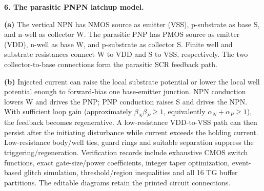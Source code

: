 \documentclass[10pt]{article}
\newcommand{\ground}[2]{\draw (#1,#2)--(#1,{#2-.12});\draw ({#1-.17},{#2-.12})--({#1+.17},{#2-.12});\draw ({#1-.11},{#2-.20})--({#1+.11},{#2-.20});}
\newcommand{\rail}[3]{\draw (#1,#2)--(#1,{#2+.14});\node[above,font=\scriptsize] at (#1,{#2+.14}) {$#3$};}
\begin{document}
\newpage\textbf{6. The parasitic PNPN latchup model.}
\begin{center}\end{center}
\textbf{(a)} The vertical NPN has NMOS source as emitter (VSS), p-substrate as base S, and n-well as collector W. The parasitic PNP has PMOS source as emitter (VDD), n-well as base W, and p-substrate as collector S. Finite well and substrate resistances connect W to VDD and S to VSS, respectively. The two collector-to-base connections form the parasitic SCR feedback path.

\textbf{(b)} Injected current can raise the local substrate potential or lower the local well potential enough to forward-bias one base-emitter junction. NPN conduction lowers W and drives the PNP; PNP conduction raises S and drives the NPN. With sufficient loop gain (approximately $\beta_N\beta_P\geq1$, equivalently $\alpha_N+\alpha_P\geq1$), the feedback becomes regenerative. A low-resistance VDD-to-VSS path can then persist after the initiating disturbance while current exceeds the holding current. Low-resistance body/well ties, guard rings and suitable separation suppress the triggering/regeneration.
\small Verification records include exhaustive CMOS switch functions, exact gate-size/power coefficients, integer taper optimization, event-based glitch simulation, threshold/region inequalities and all 16 TG buffer partitions. The editable diagrams retain the printed circuit connections.
\end{document}
